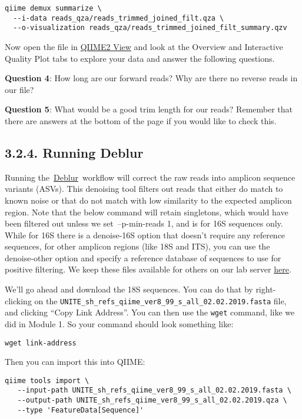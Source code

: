 \documentclass[
]{book}
\begin{document}
\begin{verbatim}
qiime demux summarize \
  --i-data reads_qza/reads_trimmed_joined_filt.qza \
  --o-visualization reads_qza/reads_trimmed_joined_filt_summary.qzv
\end{verbatim}

Now open the file in \href{https://view.qiime2.org/}{QIIME2 View} and look at the Overview and Interactive Quality Plot tabs to explore your data and answer the following questions.

\textbf{Question 4}: How long are our forward reads? Why are there no reverse reads in our file?

\textbf{Question 5}: What would be a good trim length for our reads? Remember that there are answers at the bottom of the page if you would like to check this.

\subsection{3.2.4. Running Deblur}\label{running-deblur-2}

Running the~\href{https://github.com/biocore/deblur}{Deblur}~workflow will correct the raw reads into amplicon sequence variants (ASVs). This denoising tool filters out reads that either do match to known noise or that do not match with low similarity to the expected amplicon region. Note that the below command will retain singletons, which would have been filtered out unless we set~--p-min-reads 1, and is for 16S sequences only. While for 16S there is a denoise-16S option that doesn't require any reference sequences, for other amplicon regions (like 18S and ITS), you can use the denoise-other option and specify a reference database of sequences to use for positive filtering. We keep these files available for others on our lab server \href{http://kronos.pharmacology.dal.ca/public_files/MH/deblur_non16S_ref/}{here}.

We'll go ahead and download the 18S sequences. You can do that by right-clicking on the \texttt{UNITE\_sh\_refs\_qiime\_ver8\_99\_s\_all\_02.02.2019.fasta} file, and clicking ``Copy Link Address''. You can then use the \texttt{wget} command, like we did in Module 1. So your command should look something like:

\begin{verbatim}
wget link-address
\end{verbatim}

Then you can import this into QIIME:

\begin{verbatim}
qiime tools import \
   --input-path UNITE_sh_refs_qiime_ver8_99_s_all_02.02.2019.fasta \
   --output-path UNITE_sh_refs_qiime_ver8_99_s_all_02.02.2019.qza \
   --type 'FeatureData[Sequence]'
\end{verbatim}
\end{document}

